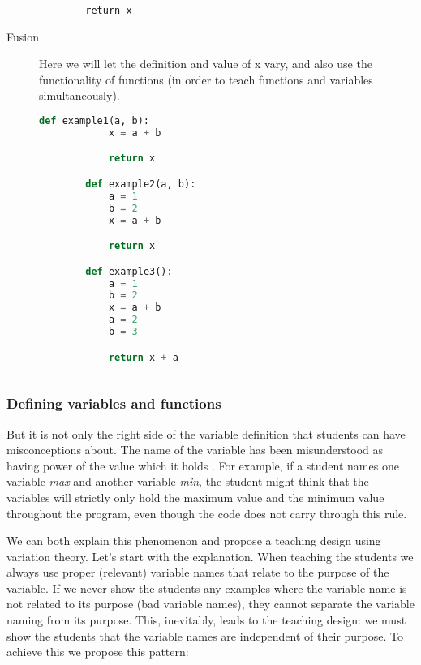 \begin{description}
\begin{minipage}[t]{0.25\columnwidth}
\begin{verbatim}
        return x
  \end{verbatim}
\end{minipage}

    \item [Fusion] Here we will let the definition and value of x vary, and 
    also use the functionality of functions (in order to teach functions and 
    variables simultaneously). 

    \begin{lstlisting}[language=Python]
        def example1(a, b):
            x = a + b

            return x

        def example2(a, b):
            a = 1
            b = 2
            x = a + b

            return x

        def example3():
            a = 1
            b = 2
            x = a + b
            a = 2
            b = 3

            return x + a
            
    \end{lstlisting}
    
\end{description}



\subsubsection{Defining variables and functions}

But it is not only the right side of the variable definition that students 
can 
have misconceptions about. The name of the variable has been misunderstood 
as 
having power of the value which it holds 
\parencite{MisconceptionsSurvey2017,Sleeman1984}. For example, if a student 
names one variable \emph{max} and another variable \emph{min}, the student 
might think that the variables will strictly only hold the maximum value and 
the minimum value throughout the program, even though the code does not 
carry through this rule. 

We can both explain this phenomenon and propose a teaching design using 
variation theory.
Let's start with the explanation.
When teaching the students we always use proper (\ie relevant) variable 
names 
that relate to the purpose of the variable.
If we never show the students any examples where the variable name is not 
related to its purpose (bad variable names), they cannot separate the 
variable 
naming from its purpose.
This, inevitably, leads to the teaching design:
we must show the students that the variable names are independent of their 
purpose. To achieve this we propose this pattern:

